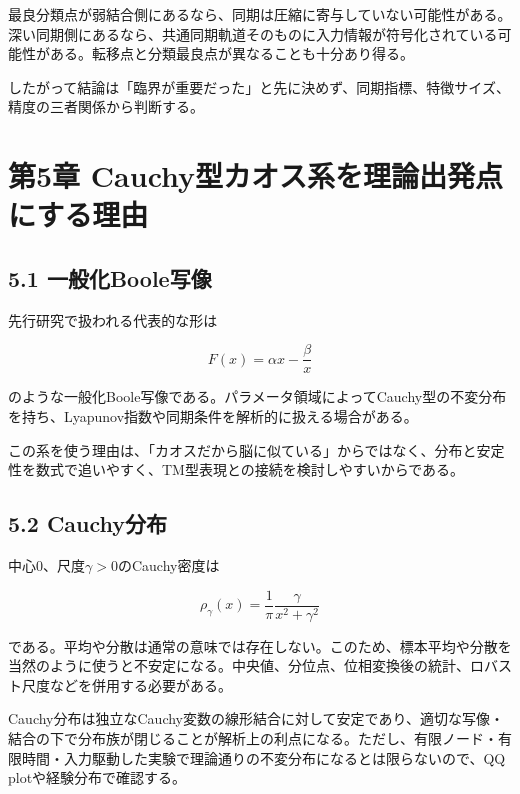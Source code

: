 \documentclass[11pt,a4paper]{ltjsarticle}
\begin{document}
最良分類点が弱結合側にあるなら、同期は圧縮に寄与していない可能性がある。深い同期側にあるなら、共通同期軌道そのものに入力情報が符号化されている可能性がある。転移点と分類最良点が異なることも十分あり得る。\par

したがって結論は「臨界が重要だった」と先に決めず、同期指標、特徴サイズ、精度の三者関係から判断する。\par

\goodbreak

\section*{\textcolor{researchink}{第5章 Cauchy型カオス系を理論出発点にする理由}}


\subsection*{\textcolor{researchblue}{5.1 一般化Boole写像}}

先行研究で扱われる代表的な形は\par

\[
F(x)=\alpha x-\frac{\beta}{x}
\]

のような一般化Boole写像である。パラメータ領域によってCauchy型の不変分布を持ち、Lyapunov指数や同期条件を解析的に扱える場合がある。\par

この系を使う理由は、「カオスだから脳に似ている」からではなく、分布と安定性を数式で追いやすく、TM型表現との接続を検討しやすいからである。\par

\subsection*{\textcolor{researchblue}{5.2 Cauchy分布}}

中心0、尺度\(\gamma>0\)のCauchy密度は\par

\[
\rho_{\gamma}(x)=\frac{1}{\pi}\frac{\gamma}{x^2+\gamma^2}
\]

である。平均や分散は通常の意味では存在しない。このため、標本平均や分散を当然のように使うと不安定になる。中央値、分位点、位相変換後の統計、ロバスト尺度などを併用する必要がある。\par

Cauchy分布は独立なCauchy変数の線形結合に対して安定であり、適切な写像・結合の下で分布族が閉じることが解析上の利点になる。ただし、有限ノード・有限時間・入力駆動した実験で理論通りの不変分布になるとは限らないので、QQ plotや経験分布で確認する。\par
\end{document}
